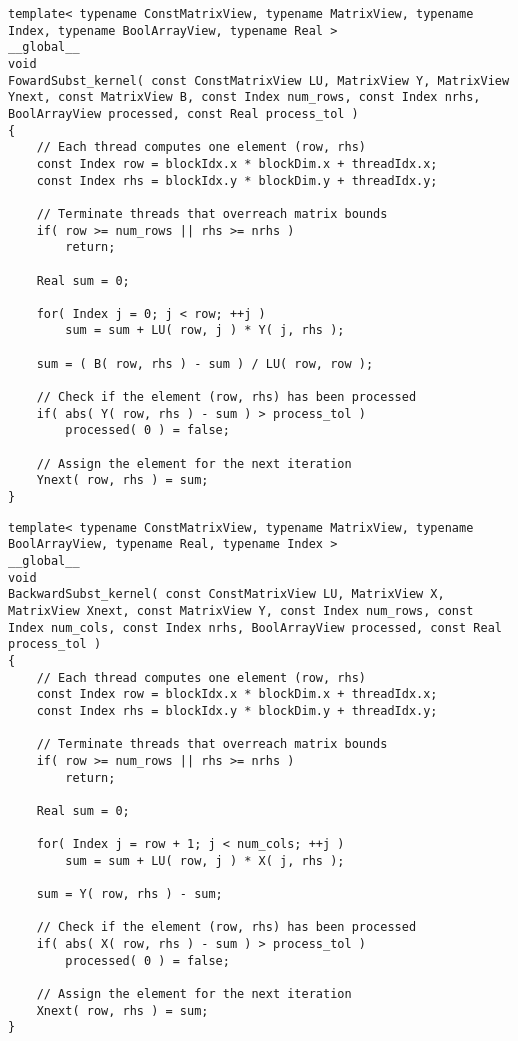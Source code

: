 \begin{lstlisting}[caption={Implementation of the \code{FowardSubst\_kernel()} kernel which computes one forward-substitution iteration.},label={Listing:ISxPP-implementation->kernels->forward-substitution}]
template< typename ConstMatrixView, typename MatrixView, typename Index, typename BoolArrayView, typename Real >
__global__
void
FowardSubst_kernel( const ConstMatrixView LU, MatrixView Y, MatrixView Ynext, const MatrixView B, const Index num_rows, const Index nrhs, BoolArrayView processed, const Real process_tol )
{
	// Each thread computes one element (row, rhs)
	const Index row = blockIdx.x * blockDim.x + threadIdx.x;
	const Index rhs = blockIdx.y * blockDim.y + threadIdx.y;
	
	// Terminate threads that overreach matrix bounds
	if( row >= num_rows || rhs >= nrhs )
		return;
	
	Real sum = 0;
	
	for( Index j = 0; j < row; ++j )
		sum = sum + LU( row, j ) * Y( j, rhs );
	
	sum = ( B( row, rhs ) - sum ) / LU( row, row );
	
	// Check if the element (row, rhs) has been processed
	if( abs( Y( row, rhs ) - sum ) > process_tol )
		processed( 0 ) = false;
	
	// Assign the element for the next iteration
	Ynext( row, rhs ) = sum;
}
\end{lstlisting}

\begin{lstlisting}[caption={Implementation of the \code{BackwardSubst\_kernel()} kernel which computes one backward-substitution iteration.},label={Listing:ISxPP-implementation->kernels->backward-substitution}]
template< typename ConstMatrixView, typename MatrixView, typename BoolArrayView, typename Real, typename Index >
__global__
void
BackwardSubst_kernel( const ConstMatrixView LU, MatrixView X, MatrixView Xnext, const MatrixView Y, const Index num_rows, const Index num_cols, const Index nrhs, BoolArrayView processed, const Real process_tol )
{
	// Each thread computes one element (row, rhs)
	const Index row = blockIdx.x * blockDim.x + threadIdx.x;
	const Index rhs = blockIdx.y * blockDim.y + threadIdx.y;
	
	// Terminate threads that overreach matrix bounds
	if( row >= num_rows || rhs >= nrhs )
		return;
	
	Real sum = 0;
	
	for( Index j = row + 1; j < num_cols; ++j )
		sum = sum + LU( row, j ) * X( j, rhs );
	
	sum = Y( row, rhs ) - sum;
	
	// Check if the element (row, rhs) has been processed
	if( abs( X( row, rhs ) - sum ) > process_tol )
		processed( 0 ) = false;
	
	// Assign the element for the next iteration
	Xnext( row, rhs ) = sum;
}
\end{lstlisting}

